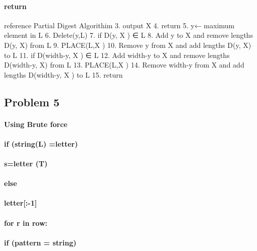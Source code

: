 \documentclass[11pt]{article}
\begin{document}
\paragraph{return}\label{return-1}

reference Partial Digest Algorithim 3. output X 4. return 5. y← maximum
element in L 6. Delete(y,L) 7. if D(y, X ) ∈ L 8. Add y to X and remove
lengths D(y, X) from L 9. PLACE(L,X ) 10. Remove y from X and add
lengths D(y, X) to L 11. if D(width-y, X ) ∈ L 12. Add width-y to X and
remove lengths D(width-y, X) from L 13. PLACE(L,X ) 14. Remove width-y
from X and add lengths D(width-y, X ) to L 15. return

    \subsection{Problem 5}\label{problem-5}

    \paragraph{Using Brute force}\label{using-brute-force}

\paragraph{if (string(L) =letter)}\label{if-stringl-letter}

\paragraph{s=letter (T)}\label{sletter-t}

\paragraph{else}\label{else}

\paragraph{letter{[}:-1{]}}\label{letter-1}

\paragraph{for r in row:}\label{for-r-in-row}

\paragraph{if (pattern = string)}\label{if-pattern-string}
\end{document}
